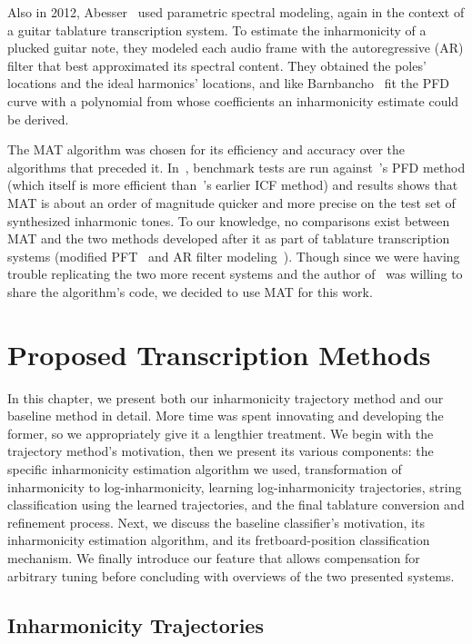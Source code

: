 \documentclass[12pt]{cmuthesis}
\begin{document}
Also in 2012, Abesser~\cite{abesser2012} used parametric spectral modeling, again in the context of a guitar tablature transcription system. To estimate the inharmonicity of a plucked guitar note, they modeled each audio frame with the autoregressive (AR) filter that best approximated its spectral content. They obtained the poles' locations and the ideal harmonics' locations, and like Barnbancho~\cite{barbanchoi2012} fit the PFD curve with a polynomial from whose coefficients an inharmonicity estimate could be derived.

The MAT algorithm was chosen for its efficiency and accuracy over the algorithms that preceded it. In~\cite{hodgkinson2009}, benchmark tests are run against~\cite{rauhala2007}'s PFD method (which itself is more efficient than~\cite{galembo1999}'s earlier ICF method) and results shows that MAT is about an order of magnitude quicker and more precise on the test set of synthesized inharmonic tones. To our knowledge, no comparisons exist between MAT and the two methods developed after it as part of tablature transcription systems (modified PFT~\cite{barbanchoi2012} and AR filter modeling~\cite{abesser2012}). Though since we were having trouble replicating the two more recent systems and the author of~\cite{hodgkinson2009} was willing to share the algorithm's code, we decided to use MAT for this work.

\noindent
\chapter{Proposed Transcription Methods}
\label{chap:method}
In this chapter, we present both our inharmonicity trajectory method and our baseline method in detail. More time was spent innovating and developing the former, so we appropriately give it a lengthier treatment. We begin with the trajectory method's motivation, then we present its various components: the specific inharmonicity estimation algorithm we used, transformation of inharmonicity to log-inharmonicity, learning log-inharmonicity trajectories, string classification using the learned trajectories, and the final tablature conversion and refinement process. Next, we discuss the baseline classifier's motivation, its inharmonicity estimation algorithm, and its fretboard-position classification mechanism. We finally introduce our feature that allows compensation for arbitrary tuning before concluding with overviews of the two presented systems.

\section{Inharmonicity Trajectories}
\end{document}
